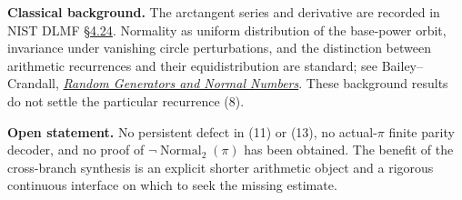 \documentclass[10pt,a4paper]{article}
\newcommand{\Normal}{\operatorname{Normal}_2}
\begin{document}
\textbf{Classical background.} The arctangent series and derivative are recorded in NIST DLMF \href{https://dlmf.nist.gov/4.24}{\S4.24}. Normality as uniform distribution of the base-power orbit, invariance under vanishing circle perturbations, and the distinction between arithmetic recurrences and their equidistribution are standard; see Bailey--Crandall, \href{https://www.davidhbailey.com/dhbpapers/bcnormal.pdf}{\emph{Random Generators and Normal Numbers}}. These background results do not settle the particular recurrence (8).

\textbf{Open statement.} No persistent defect in (11) or (13), no actual-$\pi$ finite parity decoder, and no proof of $\neg\Normal(\pi)$ has been obtained. The benefit of the cross-branch synthesis is an explicit shorter arithmetic object and a rigorous continuous interface on which to seek the missing estimate.
\end{document}
